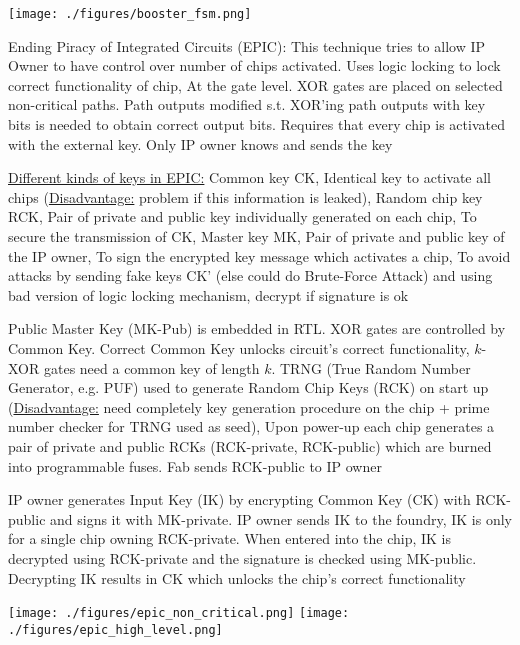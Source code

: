 \documentclass[landscape, a4paper]{article}
\begin{document}
\begin{minipage}[t]{0.2\linewidth}
\begin{betterlist}
\begin{betterlist}
\begin{betterlist}
				\texttt{[image: ./figures/booster\_fsm.png]}
				\item \alert{Ending Piracy of Integrated Circuits (EPIC):} This technique tries to allow IP Owner to have control over number of chips activated. Uses logic locking to lock correct functionality of chip, At the gate level. XOR gates are placed on selected non-critical paths. Path outputs modified s.t. XOR’ing path outputs with key bits is needed to obtain correct output bits. Requires that every chip is activated with the external key. Only IP owner knows and sends the key
				\begin{betterlist}
					\item \underline{Different kinds of keys in EPIC:} \alert{Common key CK}, Identical key to activate all chips \alert{(\underline{Disadvantage:} problem if this information is leaked)}, \alert{Random chip key RCK}, Pair of private and public key individually generated on each chip, \alert{To secure the transmission of CK}, \alert{Master key MK}, Pair of private and public key of the IP owner, To sign the encrypted key message which activates a chip, \alert{To avoid attacks by sending fake keys CK' (else could do Brute-Force Attack) and using bad version of logic locking mechanism, decrypt if signature is ok }
          \item Public Master Key (MK-Pub) is embedded in RTL. XOR gates are controlled by Common Key. Correct Common Key unlocks circuit's correct functionality, $k$-XOR gates need a common key of length $k$. TRNG (True Random Number Generator, e.g. PUF) used to generate Random Chip Keys (RCK) on start up (\alert{\underline{Disadvantage:} need completely key generation procedure on the chip + prime number checker for TRNG used as seed}), Upon power-up each chip generates a pair of private and public RCKs (RCK-private, RCK-public) which are burned into programmable fuses. Fab sends RCK-public to IP owner
					\item IP owner generates Input Key (IK) by encrypting Common Key (CK) with RCK-public and signs it with MK-private. IP owner sends IK to the foundry, IK is only for a single chip owning RCK-private. When entered into the chip, IK is decrypted using RCK-private and the signature is checked using MK-public. Decrypting IK results in CK which unlocks the chip’s correct functionality
				\end{betterlist}
			\end{betterlist}

			\texttt{[image: ./figures/epic\_non\_critical.png]}
			\texttt{[image: ./figures/epic\_high\_level.png]}


\end{betterlist}
\end{betterlist}
\end{minipage}
\end{document}
